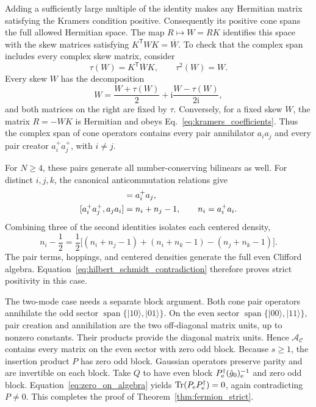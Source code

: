 \documentclass[11pt,a4paper]{article}
\newcommand{\Tr}{\operatorname{Tr}}
\newcommand{\ii}{\mathrm i}
\newcommand{\trans}{\mathsf T}
\newcommand{\mc}[1]{\mathcal{#1}}
\theoremstyle{remark}
\numberwithin{equation}{section}
\begin{document}
Adding a sufficiently large multiple of the identity makes any Hermitian
matrix satisfying the Kramers condition positive. Consequently its positive
cone spans the full allowed Hermitian space. The map \(R\mapsto W=RK\)
identifies this space with the skew matrices satisfying
\(K^\trans W K=\overline W\). To check that the complex span includes
every complex skew matrix, consider
\begin{equation}
\tau(W)=K^\trans\overline W K,\qquad \tau^2(W)=W.
\end{equation}
Every skew \(W\) has the decomposition
\begin{equation}
W=\frac{W+\tau(W)}2
+\ii\frac{W-\tau(W)}{2\ii},
\label{eq:real_form_decomposition}
\end{equation}
and both matrices on the right are fixed by \(\tau\). Conversely, for a
fixed skew \(W\), the matrix \(R=-WK\) is Hermitian and obeys
Eq.~\eqref{eq:kramers_coefficients}. Thus the complex span of cone
operators contains every pair annihilator \(a_i a_j\) and every pair
creator \(a_i^+a_j^+\), with \(i\ne j\).

For \(N\geq4\), these pairs generate all number-conserving bilinears as
well. For distinct \(i,j,k\), the canonical anticommutation relations give
\begin{align}
[a_i^+a_k^+,a_k a_j]&=a_i^+a_j,\notag\\
[a_i^+a_j^+,a_j a_i]&=n_i+n_j-1,
\qquad n_i=a_i^+a_i.
\label{eq:pair_commutators}
\end{align}
Combining three of the second identities isolates each centered density,
\begin{equation}
n_i-\frac12=\frac12\bigl[(n_i+n_j-1)
+(n_i+n_k-1)-(n_j+n_k-1)\bigr].
\end{equation}
The pair terms, hoppings, and centered densities generate the full even
Clifford algebra. Equation~\eqref{eq:hilbert_schmidt_contradiction} therefore
proves strict positivity in this case.

The two-mode case needs a separate block argument. Both cone pair operators
annihilate the odd sector
\(\operatorname{span}\{|10\rangle,|01\rangle\}\). On the even sector
\(\operatorname{span}\{|00\rangle,|11\rangle\}\), pair creation and
annihilation are the two off-diagonal matrix units, up to nonzero constants.
Their products provide the diagonal matrix units. Hence
\(\mc A_{\mc C}\) contains every matrix on the even sector with zero odd
block. Because \(s\geq1\), the insertion product \(P\) has zero odd block.
Gaussian operators preserve parity and are invertible on each block. Take
\(Q\) to have even block
\(P_{\rm e}^\dagger(\hat g_0)_{\rm e}^{-1}\) and zero odd block.
Equation~\eqref{eq:zero_on_algebra} yields
\(\Tr(P_{\rm e}P_{\rm e}^\dagger)=0\), again contradicting \(P\ne0\).
This completes the proof of Theorem~\ref{thm:fermion_strict}.
\end{document}
